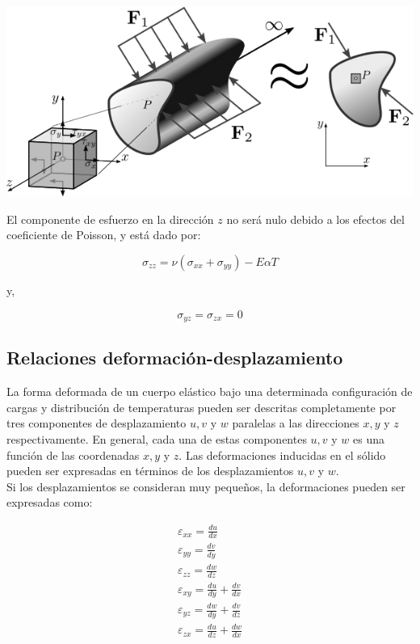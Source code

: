 \begin{center}
\includegraphics[scale=0.55]{src/plane_strain.png}
\label{fig:fg2}
\end{center}

El componente de esfuerzo en la dirección $z$ no será nulo debido a los efectos del coeficiente de Poisson, y está 
dado por:

\begin{equation}
\sigma_{zz} = \nu(\sigma_{xx}+\sigma_{yy}) - E \alpha T
\end{equation}

y, 

\begin{equation}
\sigma_{yz} = \sigma_{zx} = 0
\end{equation}

\subsection{Relaciones deformación-desplazamiento}

La forma deformada de un cuerpo elástico bajo una determinada configuración de cargas y distribución de temperaturas 
pueden ser descritas completamente por tres componentes de desplazamiento $u, v$ y $w$ paralelas a las direcciones 
$x, y$ y $z$ respectivamente. En general, cada una de estas componentes $u,v$ y $w$ es una función de las 
coordenadas $x,y$ y $z$. Las deformaciones inducidas en el sólido pueden ser expresadas en términos de los 
desplazamientos $u,v$ y $w$.\\

Si los desplazamientos se consideran muy pequeños, la deformaciones pueden ser expresadas como:

\begin{subequations}
\begin{eqnarray}
\varepsilon_{xx} = \frac{du}{dx} \\
\varepsilon_{yy} = \frac{dv}{dy} \\
\varepsilon_{zz} = \frac{dw}{dz} \\
\varepsilon_{xy} = \frac{du}{dy} + \frac{dv}{dx} \\
\varepsilon_{yz} = \frac{dw}{dy} + \frac{dv}{dz} \\
\varepsilon_{zx} = \frac{du}{dz} + \frac{dw}{dx} \\
\end{eqnarray}
\end{subequations}

